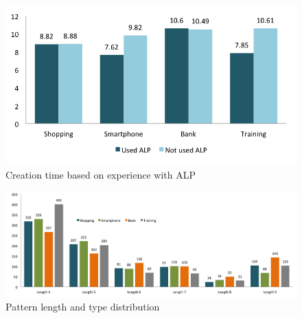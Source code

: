     \begin{figure}[H]
      \centering
    \end{figure}

    \begin{figure}[H]
      \centering
      \includegraphics[scale=0.65]{pics/analysis/usedALPpatterncreationtime.png}
      \caption{Creation time based on experience with ALP}
      \label{fig:usedALPpatterncreationtime}
    \end{figure}

    \begin{figure}[H]
      \centering
      \includegraphics[width=\textwidth]{pics/analysis/patterntypePatternLength.png}
      \caption{Pattern length and type distribution}
      \label{fig:patternTypePatternLength}
    \end{figure}

